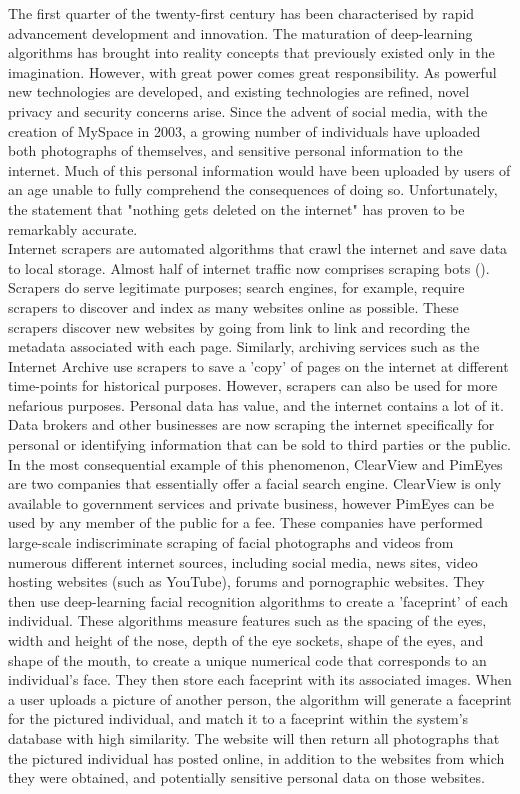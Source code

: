 \documentclass{article}
\begin{document}
The first quarter of the twenty-first century has been characterised by rapid advancement development and innovation.
The maturation of deep-learning algorithms has brought into reality concepts that previously existed only in the imagination.  
However, with great power comes great responsibility. 
As powerful new technologies are developed, and existing technologies are refined, novel privacy and security concerns arise.
Since the advent of social media, with the creation of MySpace in 2003, a growing number of individuals have uploaded both photographs of themselves, and sensitive personal information to the internet.
Much of this personal information would have been uploaded by users of an age unable to fully comprehend the consequences of doing so.
Unfortunately, the statement that "nothing gets deleted on the internet" has proven to be remarkably accurate.
\vspace{0.3cm} \\ 
Internet scrapers are automated algorithms that crawl the internet and save data to local storage.
Almost half of internet traffic now comprises scraping bots (\cite{conde2024five}).
Scrapers do serve legitimate purposes; search engines, for example, require scrapers to discover and index as many websites online as possible.
These scrapers discover new websites by going from link to link and recording the metadata associated with each page.
Similarly, archiving services such as the Internet Archive use scrapers to save a 'copy' of pages on the internet at different time-points for historical purposes.
However, scrapers can also be used for more nefarious purposes. Personal data has value, and the internet contains a lot of it.
Data brokers and other businesses are now scraping the internet specifically for personal or identifying information that can be sold to third parties or the public.
\vspace{0.3cm} \\
In the most consequential example of this phenomenon, ClearView and PimEyes are two companies that essentially offer a facial search engine.
ClearView is only available to government services and private business, however PimEyes can be used by any member of the public for a fee.
These companies have performed large-scale indiscriminate scraping of facial photographs and videos from numerous different internet sources, including social media, news sites, video hosting websites (such as YouTube), forums and pornographic websites.
They then use deep-learning facial recognition algorithms to create a 'faceprint' of each individual.
These algorithms measure features such as the spacing of the eyes, width and height of the nose, depth of the eye sockets, shape of the eyes, and shape of the mouth, to create a unique numerical code that corresponds to an individual's face.
They then store each faceprint with its associated images.
When a user uploads a picture of another person, the algorithm will generate a faceprint for the pictured individual, and match it to a faceprint within the system's database with high similarity.
The website will then return all photographs that the pictured individual has posted online, in addition to the websites from which they were obtained, and potentially sensitive personal data on those websites. 

\end{document}
